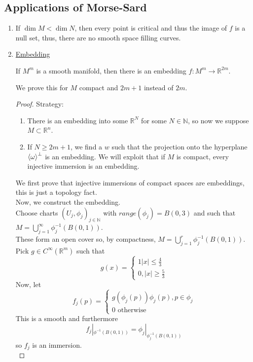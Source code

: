 \documentclass[../main.tex]{subfiles}
\begin{document}
\subsection{Applications of Morse-Sard}
\begin{enumerate}
\item If $\dim M < \dim N$, then every point is critical and thus the image of $f$ is a null set, thus, there are no smooth space filling curves.
\item \underline{Embedding}\\
	\begin{thm}[Whitney]
		If $M^{m}$ is a smooth manifold, then there is an embedding $f: M^{m}\to \mathbb{R}^{2m}$.
	\end{thm}
	We prove this for $M$ compact and $2m+1$ instead of $2m$.
	\begin{proof}
	Strategy:
	\begin{enumerate}
	\item There is an embedding into some $\mathbb{R}^{N}$ for some $N \in \mathbb{N}$, so now we suppose $M \subset \mathbb{R}^n$.
	\item If $N \geq 2m+1$, we find a $w$ such that the projection onto the hyperplane$ \left\langle\omega\right\rangle^{\perp}$ is an embedding. We will exploit that if $M$ is compact, every injective immersion is an embedding.
	\end{enumerate}
We first prove that injective immersions of compact spaces are embeddings, this is just a topology fact.\\
Now, we construct the embedding.\\
Choose charts  $ ( U_j, \phi_j)_{j \in \mathbb{N}} $ with $range( \phi_j) = B( 0,3) $ and such that $M = \bigcup_{j=1}^{ \infty }\phi_j^{-1}( B( 0,1) ) $.\\
These form an open cover so, by compactness, $M = \bigcup_{j=1}^{r}\phi_j^{-1 }( B( 0,1) ) $.\\
Pick $g\in C^{ \infty }( \mathbb{R}^m) $ such that
\[ 
g( x) = 
\begin{cases}
1 |x| \leq \frac{4}{3}\\
0, |x| \geq \frac{5}{3}
\end{cases}
\]
Now, let
\[ 
f_j( p) = 
\begin{cases}
g( \phi_j( p) ) \phi_j( p), p \in \phi_j\\
0 \text{ otherwise } 
\end{cases}
\]
This is a smooth and furthermore
\[ 
f_j|_{\phi^{-1}( B( 0,1) ) } = \phi_j|_{\phi_j^{-1}( B( 0,1) ) } 
\]
so $f_j$ is an immersion.\\

\end{proof}
\end{enumerate}
\end{document}
